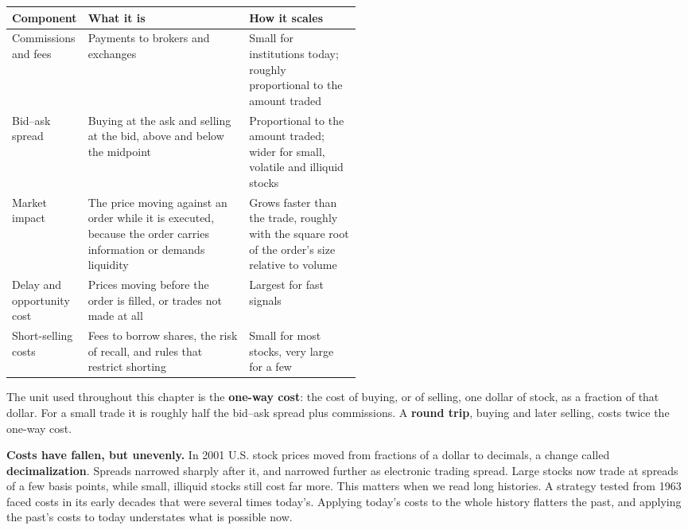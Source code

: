 \begin{center}
\small
\begin{tabularx}{0.9\linewidth}{@{}>{\raggedright\arraybackslash}p{0.19\linewidth}>{\raggedright\arraybackslash}X>{\raggedright\arraybackslash}p{0.32\linewidth}@{}}
\toprule
Component & What it is & How it scales \\
\midrule
Commissions and fees & Payments to brokers and exchanges & Small for institutions today; roughly proportional to the amount traded \\
Bid--ask spread & Buying at the ask and selling at the bid, above and below the midpoint & Proportional to the amount traded; wider for small, volatile and illiquid stocks \\
Market impact & The price moving against an order while it is executed, because the order carries information or demands liquidity & Grows faster than the trade, roughly with the square root of the order's size relative to volume \\
Delay and opportunity cost & Prices moving before the order is filled, or trades not made at all & Largest for fast signals \\
Short-selling costs & Fees to borrow shares, the risk of recall, and rules that restrict shorting & Small for most stocks, very large for a few \\
\bottomrule
\end{tabularx}
\end{center}

The unit used throughout this chapter is the \textbf{one-way cost}: the cost of buying, or of selling, one dollar of stock, as a fraction of that dollar. For a small trade it is roughly half the bid--ask spread plus commissions. A \textbf{round trip}, buying and later selling, costs twice the one-way cost.

\textbf{Costs have fallen, but unevenly.} In 2001 U.S. stock prices moved from fractions of a dollar to decimals, a change called \textbf{decimalization}. Spreads narrowed sharply after it, and narrowed further as electronic trading spread. Large stocks now trade at spreads of a few basis points, while small, illiquid stocks still cost far more. This matters when we read long histories. A strategy tested from 1963 faced costs in its early decades that were several times today's. Applying today's costs to the whole history flatters the past, and applying the past's costs to today understates what is possible now.

